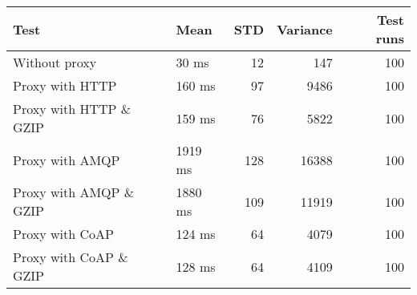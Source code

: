 \begin{tabularx}{\textwidth}{llrrr}
\hline
 Test                   & Mean    &   STD &   Variance &   Test runs \\
\hline
 Without proxy          & 30 ms   &    12 &        147 &         100 \\
 Proxy with HTTP        & 160 ms  &    97 &       9486 &         100 \\
 Proxy with HTTP \& GZIP & 159 ms  &    76 &       5822 &         100 \\
 Proxy with AMQP        & 1919 ms &   128 &      16388 &         100 \\
 Proxy with AMQP \& GZIP & 1880 ms &   109 &      11919 &         100 \\
 Proxy with CoAP        & 124 ms  &    64 &       4079 &         100 \\
 Proxy with CoAP \& GZIP & 128 ms  &    64 &       4109 &         100 \\
\hline
\end{tabularx}